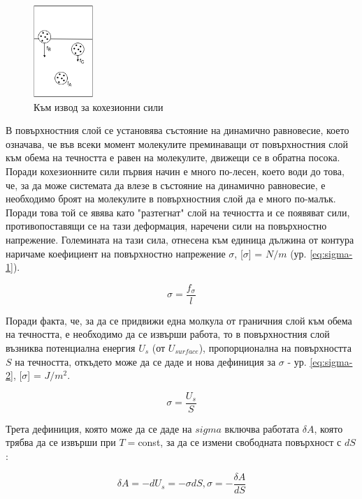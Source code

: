 \documentclass[12pt]{article}
\begin{document}
\begin{figure}
    \centering
    \includegraphics[width=0.2\textwidth]{images/cohesion-forces.png}
    \caption{\label{fig:cohesion-forces} Към извод за кохезионни сили}
\end{figure}

В повърхностния слой се установява състояние на динамично равновесие, което означава, че във всеки момент молекулите преминаващи от повърхностния слой към обема на течността е равен на молекулите, движещи се в обратна посока. Поради кохезионните сили първия начин е много по-лесен, което води до това, че, за да може системата да влезе в състояние на динамично равновесие, е необходимо броят на молекулите в повърхностния слой да е много по-малък. Поради това той се явява като "разтегнат" слой на течността и се появяват сили, противопоставящи се на тази деформация, наречени сили на повърхностно напрежение. Големината на тази сила, отнесена към единица дължина от контура наричаме коефициент на повърхностно напрежение $\sigma$, [$\sigma$] = $N/m$ (ур. \ref{eq:sigma-1}). 

\begin{equation}\label{eq:sigma-1}
    \sigma = \frac{f_\sigma}{l}
\end{equation}

Поради факта, че, за да се придвижи една молкула от граничния слой към обема на течността, е необходимо да се извърши работа, то в повърхностния слой възниква потенциална енергия $U_{s}$ (от $U_{surface}$), пропорционална на повърхността $S$ на течността, откъдето може да се даде и нова дефиниция за $\sigma$ - ур. \ref{eq:sigma-2}, [$\sigma$] = $J/m^2$.

\begin{equation}\label{eq:sigma-2}
    \sigma = \frac{U_s}{S}
\end{equation}

Трета дефиниция, която може да се даде на $sigma$ включва работата $\delta A$, която трябва да се извърши при $T=$const, за да се измени свободната повърхност с $dS$:

\begin{equation}
    \delta A = -dU_s = -\sigma dS,
    \sigma = -\frac{\delta A}{dS}
\end{equation}
\end{document}
